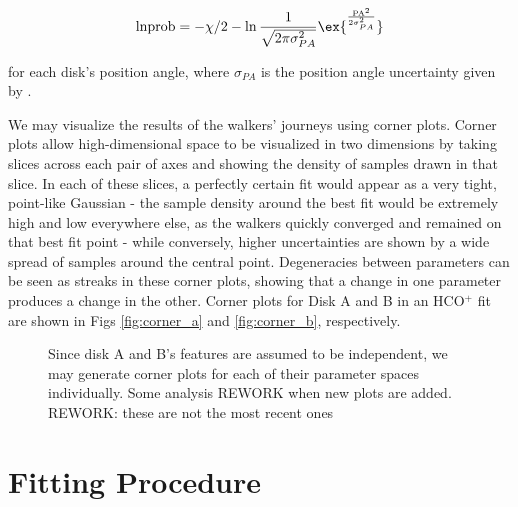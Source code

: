 \begin{align}
  \text{lnprob} = -\chi/2  -\ln{\frac{1}{\sqrt{2 \pi \sigma_{PA}^2}}} \ex{^{\frac{\text{PA}^2}{2 \sigma_{PA}^2}}}
\end{align}

\noindent
for each disk's position angle, where $\sigma_{PA}$ is the position angle uncertainty given by \citet{Williams2014}.



We may visualize the results of the walkers' journeys using corner plots. Corner plots allow high-dimensional space to be visualized in two dimensions by taking slices across each pair of axes and showing the density of samples drawn in that slice. In each of these slices, a perfectly certain fit would appear as a very tight, point-like Gaussian - the sample density around the best fit would be extremely high and low everywhere else, as the walkers quickly converged and remained on that best fit point - while conversely, higher uncertainties are shown by a wide spread of samples around the central point. Degeneracies between parameters can be seen as streaks in these corner plots, showing that a change in one parameter produces a change in the other. Corner plots for Disk A and B in an HCO$^+$ fit are shown in Figs \ref{fig:corner_a} and \ref{fig:corner_b}, respectively.


\begin{figure}[htp]
  \hspace*{\fill}%
  \hfill%
  \hspace*{\fill}%
  \caption{Since disk A and B's features are assumed to be independent, we may generate corner plots for each of their parameter spaces individually. Some analysis REWORK when new plots are added. REWORK: these are not the most recent ones}
  \label{fig:corner_plots}
\end{figure}





\section{Fitting Procedure}
\label{section:fitting_procedure}

